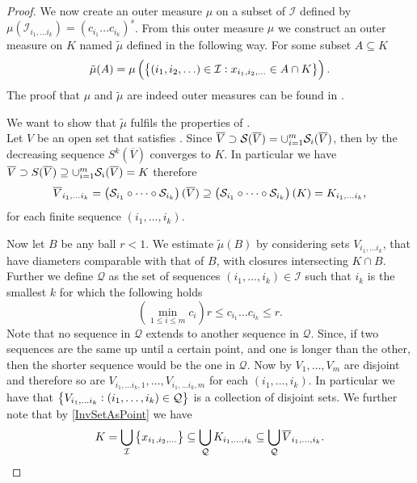 \begin{proof}
	We now create an outer measure $\mu$ on a subset of $\mathcal{I}$ defined by $\mu(\mathcal{I}_{i_1, \ldots i_k}) = (c_{i_1} \dots c_{i_k})^{s}$. From this outer measure $\mu$ we construct an outer measure on $K$ named $\tilde{\mu}$ defined in the following way. For some subset $A \subseteq K$
	\begin{equation}
		\tilde{\mu}(A) = \mu \left(\cbr{(i_1, i_2, \ldots)\in \mathcal{I} : x_{i_1, i_2, \ldots} \in A \cap K}\right).
	\end{equation}  The proof that $\mu$ and $\tilde{\mu}$ are indeed outer measures can be found in \cite[Section 7]{mona}.

	\medskip
	We want to show that $\tilde{\mu}$ fulfils the properties of . \\
	Let $V$ be an open set that satisfies .  Since $\overline{V} \supset \mathcal{S}(\overline{V}) = \cup_{i = 1}^{m} \mathcal{S}_{i}(\overline{V})$, then by  the decreasing sequence $S^{k}(\overline{V})$ converges to $K$. In particular we have \nl $\overline{V} \supset S(\overline{V}) \supseteq \cup_{i = 1}^{m} \mathcal{S}_i(\overline{V}) = K$ therefore
	\begin{equation}
		\overline{V}_{i_1, \ldots i_k} =\left(\mathcal{S}_{i_1} \circ \dots \circ \mathcal{S}_{i_k}\right)(\overline{V}) \supseteq \left(\mathcal{S}_{i_1} \circ \dots \circ \mathcal{S}_{i_k}\right)(K) = K_{i_1, \ldots i_k},
	\end{equation}
	  for each finite sequence $(i_1, \ldots, i_k)$. 
	
	Now let $B$ be any ball $r < 1$. We estimate $\tilde{\mu}(B)$ by considering sets $V_{i_1, \ldots i_k}$, that have diameters comparable with that of $B$, with closures intersecting $K \cap B$. Further we define $\mathcal{Q}$ as the set of sequences $(i_1, \ldots, i_k) \in \mathcal{I}$ such that $i_k$ is the smallest $k$ for which the following holds
	\begin{equation}
		\left(\min_{1 \leq i \leq m} c_i\right) r \leq c_{i_1} \dots c_{i_k} \leq r.
	\end{equation}
	Note that no sequence in $\mathcal{Q}$ extends to another sequence in $\mathcal{Q}$. Since, if two sequences are the same up until a certain point, and one is longer than the other, then the shorter sequence would be the one in $\mathcal{Q}$.  Now by  $V_1, \ldots, V_m$ are disjoint and therefore so are $V_{i_1, \ldots i_k, 1}, \ldots, V_{i_1, \ldots i_k, m}$ for each $(i_1, \ldots, i_k)$. In particular we have that $\cbr{V_{i_1, \ldots i_k} : (i_1, \ldots, i_k) \in \mathcal{Q}}$ is a collection of disjoint sets. We further note that by \eqref{InvSetAsPoint} we have
	\begin{equation}\label{KasCompactV}
		K = \bigcup_{\mathcal{I}} \cbr{x_{i_1, i_2, \ldots}} \subseteq \bigcup_{\mathcal{Q}} K_{i_1, \ldots, i_k} \subseteq \bigcup_{\mathcal{Q}} \overline{V}_{i_1, \ldots, i_k}.
	\end{equation}
	

\end{proof}
